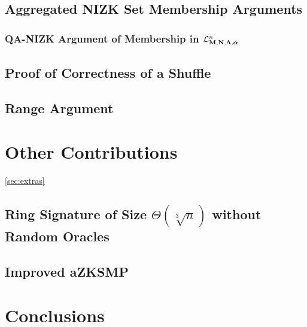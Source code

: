     \section{Aggregated NIZK Set Membership Arguments} \label{sec:aZKSMP}

        

        \subsection{QA-NIZK Argument of Membership in $\mathcal{L}_{\mathbf{{M}},\mathbf{{N}},\mathbf{{\Lambda}},{\boldsymbol \alpha}}^n$} \label{sec:bin-lan-constr}

            

    \section{Proof of Correctness of a Shuffle} \label{sec:shuffle}

        

    \section{Range Argument} \label{sec:range-proof}

        

\chapter{Other Contributions} \ref{sec:extras}

    \section{Ring Signature of Size $\Theta(\sqrt[3]{n})$ without Random Oracles}

        

    \section{Improved aZKSMP}

        

\chapter{Conclusions}

        
